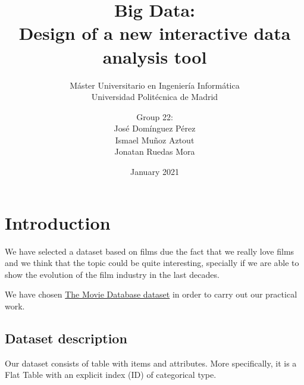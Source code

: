 

\title{Big Data:\\ Design of a new interactive data analysis tool}
\subtitle{Máster Universitario en Ingeniería Informática\\
		  Universidad Politécnica de Madrid}
\author{Group 22:\\
		José Domínguez Pérez\\
		Ismael Muñoz Aztout\\
		Jonatan Ruedas Mora}
\date{January 2021}

\makeindex

\maketitle
\tableofcontents
\newpage

\section{Introduction}

We have selected a dataset based on films due the fact that we really love films and we think that the topic could be quite interesting, specially if we are able to show the evolution of the film industry in the last decades.

We have chosen \href{https://www.kaggle.com/tmbd/tmdb-movie-metadata?select=tmdb_5000_movies.csv}{The Movie Database dataset} in order to carry out our practical work.

\subsection{Dataset description}
Our dataset consists of table with items and attributes. More specifically, it is a Flat Table with an explicit index (ID) of categorical type. 


